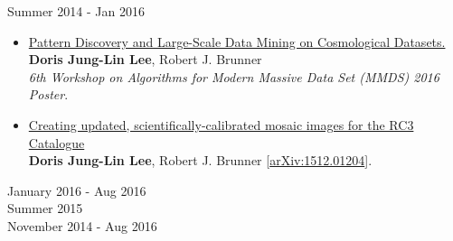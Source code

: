 \documentclass{res}
\begin{document}
\begin{resume}
   \vspace{-10pt}
\vspace{5pt}
\hspace{-10pt}{\normalsize\bf University of Illinois Laboratory for Cosmological Data Mining} \hspace{40pt} Summer 2014 - Jan 2016
\begin{itemize}[leftmargin=0.3em]
 \item \href{http://dorisjunglinlee.com/files/MMDS_poster.pdf}{Pattern Discovery and Large-Scale Data Mining on Cosmological Datasets.}
  \\ {\footnotesize\textbf{Doris Jung-Lin Lee}, Robert J. Brunner 
  \vspace{-5pt}
  \\ \textit{6th Workshop on Algorithms for Modern Massive Data Set (MMDS) 2016 Poster}}. 
 \item \href{http://arxiv.org/abs/1512.01204}{Creating updated, scientifically-calibrated mosaic images for the RC3 Catalogue} 
 \vspace{-5pt}
 \\ {\footnotesize\textbf{Doris Jung-Lin Lee}, Robert J. Brunner  [\href{http://arxiv.org/abs/1512.01204}{arXiv:1512.01204}]}. 
\end{itemize}
\vspace{-5pt}
\hspace{-10pt}{\normalsize\bf UC Berkeley AMP Lab Big Data Genomics Group} \hspace{100pt}  January 2016 - Aug 2016 \\
\hspace{-10pt}{\normalsize\bf Princeton Astrophysical Fluid Dynamics Group} \hspace{165pt}  Summer 2015 \\
\hspace{-10pt}{\normalsize\bf UC Berkeley Star Formation Theory Group} \hspace{125pt}  November 2014 - Aug 2016
\newpage

\end{resume}
\end{document}
